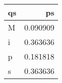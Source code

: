 \begin{tabular}{lr}
\toprule
qs &        ps \\
\midrule
 M &  0.090909 \\
 i &  0.363636 \\
 p &  0.181818 \\
 s &  0.363636 \\
\bottomrule
\end{tabular}
